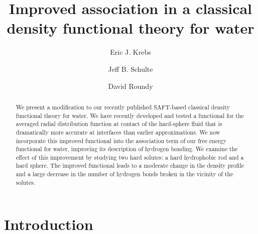 \documentclass[preprint, endfloats,amsmath,amssymb,jcp]{revtex4-1}
\begin{document}
\title{Improved association in a classical density functional theory
  for water}

\author{Eric J. Krebs}
\author{Jeff B. Schulte}
\author{David Roundy}

\begin{abstract}
We present a modification to our recently published SAFT-based classical
density functional theory for water.
%
We have recently developed and tested a functional for the averaged
radial distribution function at contact of the hard-sphere fluid
that is dramatically more accurate at interfaces than earlier
approximations.
%
We now incorporate this improved functional into the association term
of our free energy functional for water, improving its description of
hydrogen bonding.
%
We examine the effect of this improvement by studying two hard solutes: a
hard hydrophobic rod and a hard sphere.
%
The improved functional leads to a moderate change in the density
profile and a large decrease in the number of hydrogen bonds broken in
the vicinity of the solutes.
\end{abstract}
\maketitle

\section{Introduction}
\end{document}
